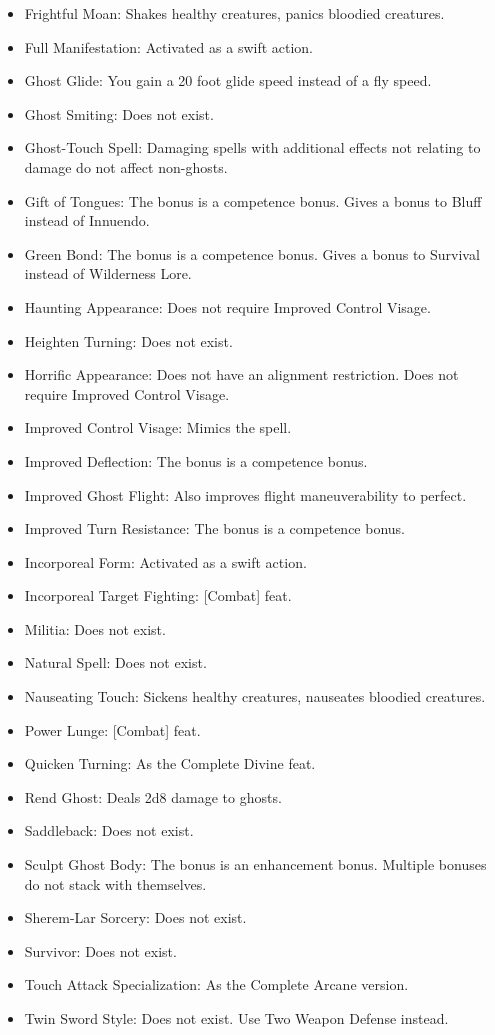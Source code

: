 \begin{itemize}
\item Frightful Moan: Shakes healthy creatures, panics bloodied creatures.
\item Full Manifestation: Activated as a swift action.
\item Ghost Glide: You gain a 20 foot glide speed instead of a fly speed.
\item Ghost Smiting: Does not exist.
\item Ghost-Touch Spell: Damaging spells with additional effects not relating to damage do not affect non-ghosts.
\item Gift of Tongues: The bonus is a competence bonus. Gives a bonus to Bluff instead of Innuendo.
\item Green Bond: The bonus is a competence bonus. Gives a bonus to Survival instead of Wilderness Lore.
\item Haunting Appearance: Does not require Improved Control Visage.
\item Heighten Turning: Does not exist.
\item Horrific Appearance: Does not have an alignment restriction. Does not require Improved Control Visage.
\item Improved Control Visage: Mimics the  spell.
\item Improved Deflection: The bonus is a competence bonus.
\item Improved Ghost Flight: Also improves flight maneuverability to perfect.
\item Improved Turn Resistance: The bonus is a competence bonus.
\item Incorporeal Form: Activated as a swift action.
\item Incorporeal Target Fighting: [Combat] feat.
\item Militia: Does not exist.
\item Natural Spell: Does not exist.
\item Nauseating Touch: Sickens healthy creatures, nauseates bloodied creatures.
\item Power Lunge: [Combat] feat.
\item Quicken Turning: As the Complete Divine feat.
\item Rend Ghost: Deals 2d8 damage to ghosts.
\item Saddleback: Does not exist.
\item Sculpt Ghost Body: The bonus is an enhancement bonus. Multiple bonuses do not stack with themselves.
\item Sherem-Lar Sorcery: Does not exist.
\item Survivor: Does not exist.
\item Touch Attack Specialization: As the Complete Arcane version.
\item Twin Sword Style: Does not exist. Use Two Weapon Defense instead.
\end{itemize}

